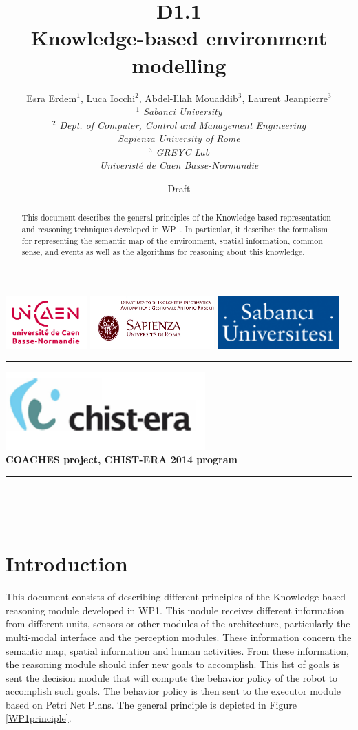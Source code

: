 \documentclass{article}
\title{D1.1\\ 
Knowledge-based environment modelling}
\author{Esra Erdem$^1$, Luca Iocchi$^2$, Abdel-Illah Mouaddib$^3$,  Laurent Jeanpierre$^3$ \\
\textit{
$^1$ Sabanci University\\
$^2$ Dept. of Computer, Control and Management Engineering\\
Sapienza University of Rome\\
$^3$ GREYC Lab\\
Univeristé de Caen Basse-Normandie}}
\date{Draft}
\newcommand{\makemadtitle}{
  \hrule
  \vspace{.5em}
  \noindent
  \begin{center}
  \textbf{
  {\centering\includegraphics[height=3cm]{../fig/logoCHISTERA2014.png}}\\
   {\centering\Large COACHES project, CHIST-ERA 2014 program}
  }
  \end{center}
  \vspace{.5em}
 
  \hrule
  \vspace{3em}
  \begin{center}
    \begin{Large}\textbf{\usebox{\notetitle}}\end{Large}\\[2em]
    \begin{large}\usebox{\noteauthor}\\ [2em] 
    \usebox{\notedate}\end{large}
  \end{center}
  \vspace{3em}
}
\begin{document}
\includegraphics[height=2cm]{../fig/logoUNICAEN.jpg}
\includegraphics[height=2cm]{../fig/logoSapienza.png}
\includegraphics[height=2cm]{../fig/logoSebanci}


\makemadtitle

\vspace*{1.0in}
\begin{abstract}
This document describes the general principles of the Knowledge-based representation and reasoning techniques developed in WP1. In particular, it describes the formalism for representing the semantic map of the environment, spatial information, common sense, and events as well as the algorithms for reasoning about this knowledge. 
\end{abstract}

\vspace*{1.5in}

\newpage
\section{Introduction}
This document consists of describing different principles of the Knowledge-based reasoning module developed in WP1. This  module receives different information from different units, sensors or other modules of the architecture, particularly the multi-modal interface and the perception modules. These information concern the semantic map, spatial information and human activities. From these information, the reasoning module should infer new goals to accomplish. This list of goals is sent the decision module that will compute the behavior policy of the robot to accomplish such goals. The behavior policy is then sent to the executor module based on Petri Net Plans. The general principle is depicted in Figure \ref{WP1principle}.
\end{document}
